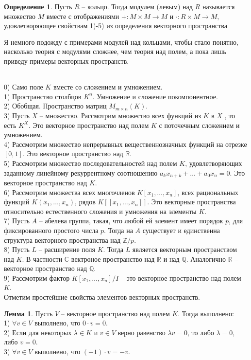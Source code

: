 \documentclass[10pt,a4paper,oneside]{book} %
\theoremstyle{definition}
\newtheorem*{defn}{Определение}
\newtheorem{lem}{Лемма}
\newcommand{\mb}[1]{\mathbb{#1}}
\def\exm{\noindent {\bf Примеры:}}
\def\dfn{\begin{defn}}
\def\edfn{\end{defn}}
\def\lm{\begin{lem}}
\def\elm{\end{lem}}
\begin{document}
\dfn Пусть $R$ -- кольцо. Тогда модулем (левым) над $R$ называется множество $M$ вместе с отображениями $+\colon M\times M \to M$ и $\cdot \colon R \times M \to M$, удовлетворяющее свойствам 1)-5) из определения векторного пространства
\edfn

Я немного подожду с примерами модулей над кольцами, чтобы стало понятно, насколько теория с модулями сложнее, чем теория над полем, а пока лишь приведу примеры векторных пространств.

\exm\\
0) Само поле $K$ вместе со сложением и умножением.\\
1) Пространство столбцов $K^n$. Умножение и сложение покомпонентное.\\
2) Обобщая. Пространство матриц $M_{m\times n}(K)$.\\
3) Пусть $X$ -- множество. Рассмотрим множество всех функций  из $K$ в $X$ , то есть $K^X$. Это векторное пространство над полем $K$ с поточечным сложением и умножением.\\
4) Рассмотрим множество непрерывных вещественнозначных функций на отрезке $[0,1]$. Это векторное пространство над $\mb R$.\\
5) Рассмотрим множество последовательностей над полем $K$, удовлетворяющих заданному линейному рекуррентному соотношению $a_k x_{n+k}+\dots+a_0x_n=0$. Это векторное пространство над $K$.\\
6) Рассмотрим множества всех многочленов $K[x_1,\dots,x_n]$, всех рациональных функций $K(x_1,\dots, x_n)$, рядов $K[[x_1,\dots,x_n]]$. Это векторные пространства относительно естественного сложения и умножения на элементы $K$.\\
7) Пусть $A$ -- абелева группа, такая, что любой ей элемент имеет порядок $p$, для фиксированного простого числа $p$. Тогда на $A$ существует и единственна структура векторного пространства над $\mb Z/p$.\\
8) Пусть $L$ -- расширение поля $K$. Тогда $L$ является векторным пространством над $K$. В частности $\mb C$ вектроное пространство над $\mb R$ и над $\mb Q$. Аналогично $\mb R$ -- векторное пространство над $\mb Q$.\\
9) Рассмотрим фактор $K[x_1,\dots,x_n]/I$ -- это векторное пространство над полем $K$.\\

Отметим простейшие свойства элементов векторных пространств.
\lm Пусть $V$ -- векторное пространство над полем $K$. Тогда выполнено:\\
1) $\forall v  \in V$ выполнено, что $0\cdot v =0$.\\
2) Если для некоторых $\lambda \in K$ и $v \in V$ верно равенство $\lambda v =0$, то либо $\lambda=0$, либо $v=0$.\\
3) $\forall v  \in V$ выполнено, что $(-1)\cdot v=-v$.\\
\elm
\end{document}

